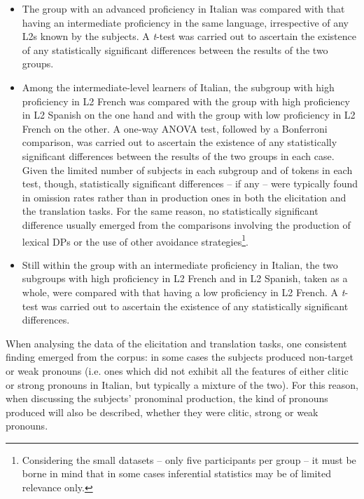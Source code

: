 \documentclass[output=paper,modfonts,nonflat,newtxmath]{langsci/langscibook}
\begin{document}
\begin{itemize}
\item
The group with an advanced proficiency in Italian was compared with that having an intermediate proficiency in the same language, irrespective of any L2s known by the subjects. A \textit{t}{}-test was carried out to ascertain the existence of any statistically significant differences between the results of the two groups.

\item
Among the intermediate-level learners of Italian, the subgroup with high proficiency in L2 French was compared with the group with high proficiency in L2 Spanish on the one hand and with the group with low proficiency in L2 French on the other. A one-way ANOVA test, followed by a Bonferroni comparison, was carried out to ascertain the existence of any statistically significant differences between the results of the two groups in each case. Given the limited number of subjects in each subgroup and of tokens in each test, though, statistically significant differences – if any – were typically found in omission rates rather than in production ones in both the elicitation and the translation tasks. For the same reason, no statistically significant difference usually emerged from the comparisons involving the production of lexical DPs or the use of other avoidance strategies\footnote{ \textrm{Considering the small datasets – only five participants per group – it must be borne in mind that in some cases inferential statistics may be of limited relevance only.}}.

\item
Still within the group with an intermediate proficiency in Italian, the two subgroups with high proficiency in L2 French and in L2 Spanish, taken as a whole, were compared with that having a low proficiency in L2 French. A \textit{t}{}-test was carried out to ascertain the existence of any statistically significant differences.

\end{itemize}

When analysing the data of the elicitation and translation tasks, one consistent finding emerged from the corpus: in some cases the subjects produced non-target or weak pronouns (i.e. ones which did not exhibit all the features of either clitic or strong pronouns in Italian, but typically a mixture of the two). For this reason, when discussing the subjects’ pronominal production, the kind of pronouns produced will also be described, whether they were clitic, strong or weak pronouns.
\end{document}
